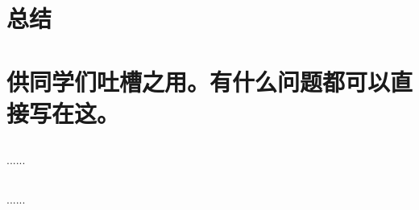 \section{总结}
\section{供同学们吐槽之用。有什么问题都可以直接写在这。}
\subsection{\stunamea}
......
\subsection{\stunameb}
......